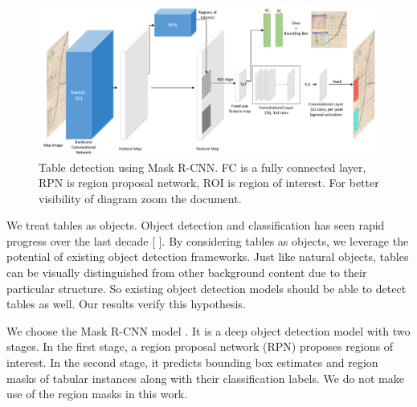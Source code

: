 \begin{figure}[h!]
\centering
\includegraphics[width=\linewidth, angle=0,keepaspectratio]{method_mask_rcnn.pdf}
\caption{Table detection using Mask R-CNN. FC is a fully connected layer, RPN is region proposal network, ROI is region of interest. For better visibility of diagram zoom the document.}
\label{fig:maskRCNN_table}
\end{figure}

We treat tables as objects. Object detection and classification has seen rapid progress over the last decade [ \cite{girshick2014rich,girshick2015fast,ren2015faster,redmon2016you,liu2016ssd,dai2017deformable,he2017mask,zhang2018single}]. By considering tables as objects, we leverage the potential of existing object detection frameworks. Just like natural objects, tables can be visually distinguished from other background content due to their particular structure. So existing object detection models should be able to detect tables as well. Our results verify this hypothesis.


We choose the Mask R-CNN model \cite{he2017mask}. It is a deep object detection model with two stages. In the first stage, a region proposal network (RPN) proposes regions of interest. In the second stage, it predicts bounding box estimates and region masks of tabular instances along with their classification labels. We do not make use of the region masks in this work. %


